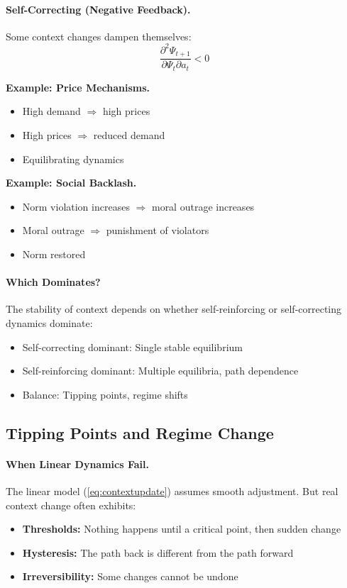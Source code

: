 \documentclass[12pt,a4paper]{article}
\begin{document}
\paragraph{Self-Correcting (Negative Feedback).}
Some context changes dampen themselves:
\begin{equation}
  \frac{\partial^2 \Psi_{t+1}}{\partial \Psi_t \partial a_t} < 0
\end{equation}

\textbf{Example: Price Mechanisms.}
\begin{itemize}
  \item High demand $\Rightarrow$ high prices
  \item High prices $\Rightarrow$ reduced demand
  \item Equilibrating dynamics
\end{itemize}

\textbf{Example: Social Backlash.}
\begin{itemize}
  \item Norm violation increases $\Rightarrow$ moral outrage increases
  \item Moral outrage $\Rightarrow$ punishment of violators
  \item Norm restored
\end{itemize}

\paragraph{Which Dominates?}
The stability of context depends on whether self-reinforcing or
self-correcting dynamics dominate:
\begin{itemize}
  \item Self-correcting dominant: Single stable equilibrium
  \item Self-reinforcing dominant: Multiple equilibria, path dependence
  \item Balance: Tipping points, regime shifts
\end{itemize}

\subsection{Tipping Points and Regime Change}

\paragraph{When Linear Dynamics Fail.}
The linear model (\ref{eq:contextupdate}) assumes smooth adjustment.
But real context change often exhibits:
\begin{itemize}
  \item \textbf{Thresholds:} Nothing happens until a critical point, then sudden change
  \item \textbf{Hysteresis:} The path back is different from the path forward
  \item \textbf{Irreversibility:} Some changes cannot be undone
\end{itemize}
\end{document}
